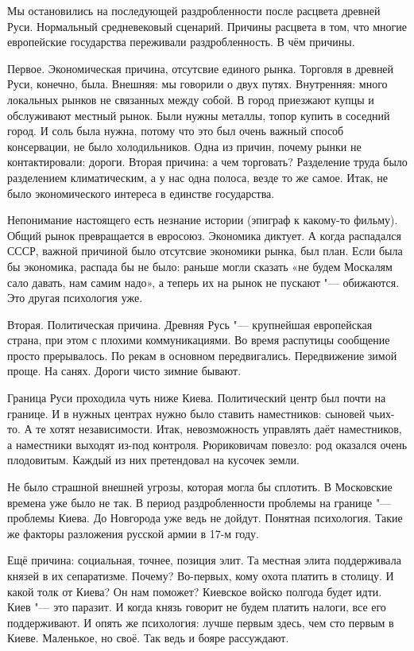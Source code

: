 
Мы остановились на последующей раздробленности после расцвета древней Руси. Нормальный средневековый сценарий. Причины расцвета в том, что многие европейские государства переживали раздробленность. В чём причины.

Первое. Экономическая причина, отсутсвие единого рынка. Торговля в древней Руси, конечно, была. Внешняя:  мы говорили о двух путях. Внутренняя: много локальных рынков не связанных между собой. В город приезжают купцы и обслуживают местный рынок. Были нужны металлы, топор купить в соседний город. И соль была нужна, потому что это был очень важный способ консервации, не было холодильников. Одна из причин, почему рынки не контактировали: дороги. Вторая причина: а чем торговать? Разделение труда было разделением климатическим, а у нас одна полоса, везде то же самое. Итак, не было экономического интереса в единстве государства.

Непонимание настоящего есть незнание истории (эпиграф к какому-то фильму). Общий рынок превращается в евросоюз. Экономика диктует. А когда распадался СССР, важной причиной было отсутсвие экономики рынка, был план. Если была бы экономика, распада бы не было: раньше могли сказать «не будем Москалям сало давать, нам самим надо», а теперь их на рынок не пускают "--- обижаются. Это другая психология уже.

Вторая. Политическая причина. Древняя Русь "--- крупнейшая европейская страна, при этом с плохими коммуникациями. Во время распутицы сообщение просто прерывалось. По рекам в основном передвигались. Передвижение зимой проще. На санях. Дороги чисто зимние бывают.

Граница Руси проходила чуть ниже Киева. Политический центр был почти на границе. И в нужных центрах нужно было ставить наместников: сыновей чьих-то. А те хотят независимости.
Итак, невозможность управлять даёт наместников, а наместники выходят из-под контроля. Рюриковичам повезло: род оказался очень плодовитым. Каждый из них претендовал на кусочек земли.

Не было страшной внешней угрозы, которая могла бы сплотить. В Московские времена уже было не так. В период раздробленности проблемы на границе "--- проблемы Киева. До Новгорода уже ведь не дойдут. Понятная психология. Такие же факторы разложения русской армии в 17-м году.

Ещё причина: социальная, точнее, позиция элит. Та местная элита поддерживала князей в их сепаратизме. Почему? Во-первых, кому охота платить в столицу. И какой толк от Киева? Он нам поможет? Киевское войско полгода будет идти. Киев "--- это паразит. И когда князь говорит не будем платить налоги, все его поддерживают. И опять же психология: лучше первым здесь, чем сто первым в Киеве. Маленькое, но своё. Так ведь и бояре рассуждают.

